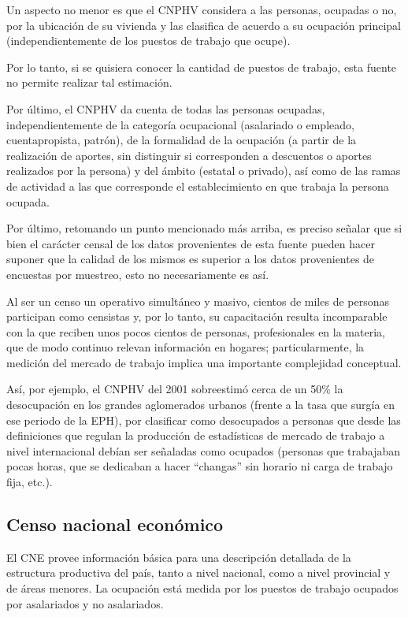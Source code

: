 \documentclass[
  openany]{book}
\begin{document}
Un aspecto no menor es que el CNPHV considera a las personas, ocupadas o no, por la ubicación de su vivienda y las clasifica de acuerdo a su ocupación principal (independientemente de los puestos de trabajo que ocupe).

Por lo tanto, si se quisiera conocer la cantidad de puestos de trabajo, esta fuente no permite realizar tal estimación.

Por último, el CNPHV da cuenta de todas las personas ocupadas, independientemente de la categoría ocupacional (asalariado o empleado, cuentapropista, patrón), de la formalidad de la ocupación (a partir de la realización de aportes, sin distinguir si corresponden a descuentos o aportes realizados por la persona) y del ámbito (estatal o privado), así como de las ramas de actividad a las que corresponde el establecimiento en que trabaja la persona ocupada.

Por último, retomando un punto mencionado más arriba, es preciso señalar que si bien el carácter censal de los datos provenientes de esta fuente pueden hacer suponer que la calidad de los mismos es superior a los datos provenientes de encuestas por muestreo, esto no necesariamente es así.

Al ser un censo un operativo simultáneo y masivo, cientos de miles de personas participan como censistas y, por lo tanto, su capacitación resulta incomparable con la que reciben unos pocos cientos de personas, profesionales en la materia, que de modo continuo relevan información en hogares; particularmente, la medición del mercado de trabajo implica una importante complejidad conceptual.

Así, por ejemplo, el CNPHV del 2001 sobreestimó cerca de un 50\% la desocupación en los grandes aglomerados urbanos (frente a la tasa que surgía en ese periodo de la EPH), por clasificar como desocupados a personas que desde las definiciones que regulan la producción de estadísticas de mercado de trabajo a nivel internacional debían ser señaladas como ocupados (personas que trabajaban pocas horas, que se dedicaban a hacer ``changas'' sin horario ni carga de trabajo fija, etc.).

\hypertarget{censo-nacional-econuxf3mico}{%
\subsection{Censo nacional económico}\label{censo-nacional-econuxf3mico}}

El CNE provee información básica para una descripción detallada de la estructura productiva del país, tanto a nivel nacional, como a nivel provincial y de áreas menores.
La ocupación está medida por los puestos de trabajo ocupados por asalariados y no asalariados.
\end{document}
